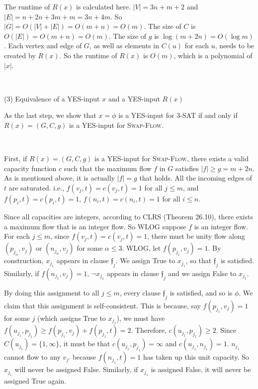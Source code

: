 \documentclass{article}
\begin{document}
The runtime of $R(x)$ is calculated here. $|V|=3n+m+2$ and $|E|=n+2n+3m+m=3n+4m$. So $|G|=O(|V|+|E|)=O(m+n)=O(m)$. The size of $C$ is $O(|E|)=O(m+n)=O(m)$. The size of $g$ is $\log(m+2n)=O(\log m)$. Each vertex and edge of $G$, as well as elements in $C(u)$ for each $u$, needs to be created by $R(x)$. So the runtime of $R(x)$ is $O(m)$, which is a polynomial of $|x|$.

~

\noindent(3) Equivalence of a YES-input $x$ and a YES-input $R(x)$

As the last step, we show that $x=\phi$ is a YES-input for \textsc{3-SAT} if and only if $R(x)=(G,C,g)$ is a YES-input for \textsc{Swap-Flow}.

~

First, if $R(x)=(G,C,g)$ is a YES-input for \textsc{Swap-Flow}, there exists a valid capacity function $c$ such that the maximum flow $f$ in $G$ satisfies $|f|\geqslant g=m+2n$. As is mentioned above, it is actually $|f|=g$ that holds. All the incoming edges of $t$ are saturated. i.e., $f(v_j,t)=c(v_j,t)=1$ for all $j\leqslant m$, and $f(p_i,t)=c(p_i,t)=1$, $f(n_i,t)=c(n_i,t)=1$ for all $i\leqslant n$.

Since all capacities are integers, according to CLRS (Theorem 26.10), there exists a maximum flow that is an integer flow. So WLOG suppose $f$ is an integer flow. For each $j\leqslant m$, since $f(v_j,t)=c(v_j,t)=1$, there must be unity flow along $(p_{j_\alpha},v_j)$ or $(n_{j_\alpha},v_j)$ for some $\alpha\leqslant3$. WLOG, let $f(p_{j_1},v_j)=1$. By construction, $x_{j_1}$ appears in clause $\mathfrak{f}_j$. We assign True to $x_{j_1}$, so that $\mathfrak{f}_j$ is satisfied. Similarly, if $f(n_{j_1},v_j)=1$, $\neg x_{j_1}$ appears in clause $\mathfrak{f}_j$ and we assign False to $x_{j_1}$.

By doing this assignment to all $j\leqslant m$, every clause $\mathfrak{f}_j$ is satisfied, and so is $\phi$. We claim that this assignment is self-consistent. This is because, say $f(p_{j_1},v_j)=1$ for some $j$ (which assigns True to $x_{j_1}$), we must have $f(u_{j_1},p_{j_1})\geqslant f(p_{j_1},v_j)+f(p_{j_1},t)=2$. Therefore, $c(u_{j_1},p_{j_1})\geqslant2$. Since $C(u_{j_1})=\{1,\infty\}$, it must be that $c(u_{j_1},p_{j_1})=\infty$ and $c(u_{j_1},n_{j_1})=1$. $n_{j_1}$ cannot flow to any $v_{j'}$ because $f(n_{j_1},t)=1$ has taken up this unit capacity. So $x_{j_1}$ will never be assigned False. Similarly, if $x_{j_1}$ is assigned False, it will never be assigned True again.
\end{document}
